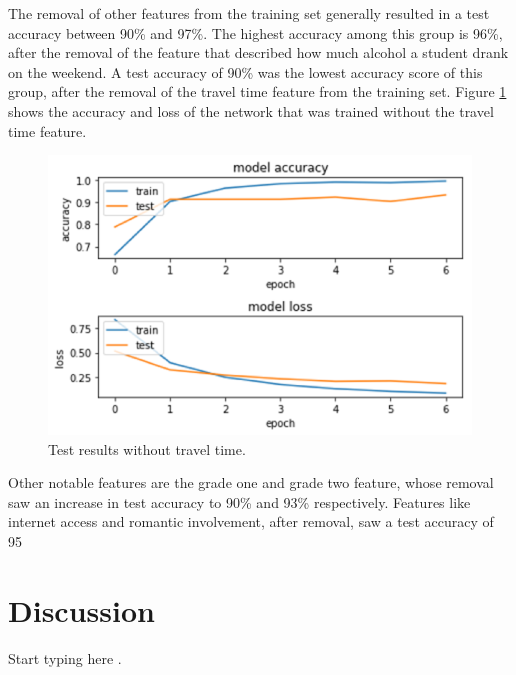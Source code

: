 \documentclass[conference]{IEEEtran}
\begin{document}
The removal of other features from the training set generally resulted in a test accuracy between 90\% and 97\%. The highest accuracy among this group is 96\%, after the removal of the feature that described how much alcohol a student drank on the weekend. A test accuracy of 90\% was the lowest accuracy score of this group, after the removal of the travel time feature from the training set. Figure \ref{results5} shows the accuracy and loss of the network that was trained without the travel time feature.

\begin{figure}[htbp]
\centerline{\includegraphics[width=\linewidth]{results5.png}}
\caption{Test results without travel time.}
\label{results5}
\end{figure}

Other notable features are the grade one and grade two feature, whose removal saw an increase in test accuracy to 90\% and 93\% respectively. Features like internet access and romantic involvement, after removal, saw a test accuracy of 95%

\section{Discussion}

Start typing here \cite{b5}.


\end{document}
